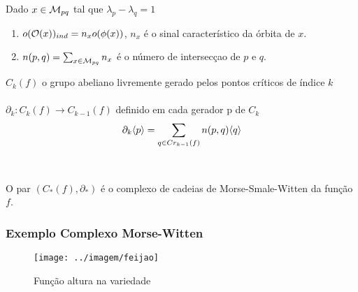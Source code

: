 \documentclass{beamer}
\begin{document}
	\begin{frame}
		\begin{definicao}
			Dado $x \in \mathcal{M}_{pq}$ tal que $\lambda_{p}-\lambda_{q} = 1$
			
			\begin{enumerate}
				\item $o(\mathcal{O}(x))_{ind} = n_{x}o(\phi(x))$, $n_{x}$ é o sinal característico da órbita de $x$.
				
				\item $n(p,q) = \sum_{x \in \mathcal{M}_{pq} }n_{x}$ é o número de intersecçao de $p$ e $q$.
			\end{enumerate}
			
		\end{definicao}
		
		\begin{definicao}
			$C_{k}(f)$ o grupo abeliano livremente gerado pelos pontos críticos de índice $k$ 
			\\~\\
			$\partial_{k}: C_{k}(f)\to C_{k-1}(f)$ definido em cada gerador p de $C_{k}$
			$$
			\partial_{k}\langle p\rangle=\sum_{q \in Cr_{k-1}(f)}n(p,q)\langle q\rangle
			$$
			\\~\\
			O par $(C_{*}(f), \partial_{*})$ é o complexo de cadeias de Morse-Smale-Witten  da função $f$.
		\end{definicao}
	\end{frame}
	
	\begin{frame}
		\frametitle{Exemplo Complexo Morse-Witten}
		
		\begin{figure}
			\centering
			\textbf{}\par
			\texttt{[image: ../imagem/feijao]}
			\caption{Função altura na variedade}
		\end{figure}
		
	\end{frame}
	
\end{document}
